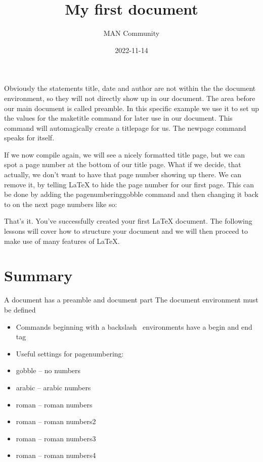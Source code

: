 \documentclass{article}
\title{My first document}
\date{2022-11-14}
\author{MAN Community}
\begin{document}
	\maketitle
	\newpage
	
Obviously the statements title, date and author are not within the the document environment, so they will not directly show up in our document. The area before our main document is called preamble. In this specific example we use it to set up the values for the maketitle command for later use in our document. This command will automagically create a titlepage for us. The newpage command speaks for itself.

If we now compile again, we will see a nicely formatted title page, but we can spot a page number at the bottom of our title page. What if we decide, that actually, we don’t want to have that page number showing up there. We can remove it, by telling LaTeX to hide the page number for our first page. This can be done by adding the pagenumbering{gobble} command and then changing it back to  on the next page numbers like so:



That’s it. You’ve successfully created your first LaTeX document. The following lessons will cover how to structure your document and we will then proceed to make use of many features of LaTeX.

\section*{Summary}

A document has a preamble and document part
The document environment must be defined
\begin{itemize}
	\item Commands beginning with a backslash \, environments have a begin and end tag
	\item Useful settings for pagenumbering:
	\item gobble – no numbers
	\item arabic – arabic numbers
	\item roman – roman numbers
	\item roman – roman numbers2
	\item roman – roman numbers3
	\item roman – roman numbers4
\end{itemize}
\end{document}
